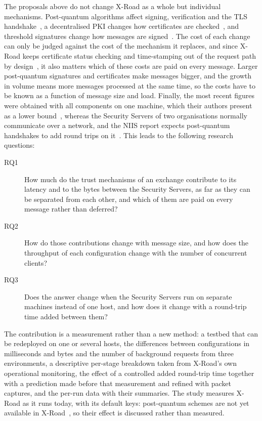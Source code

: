 \documentclass[conference,a4paper]{IEEEtran}
\begin{document}
The proposals above do not change X-Road as a whole but individual mechanisms. Post-quantum
algorithms affect signing, verification and the TLS handshake~\cite{bakhtina2026pqc}, a
decentralised PKI changes how certificates are checked~\cite{bakhtina2023ares}, and threshold
signatures change how messages are signed~\cite{bakhtina2026ijis}. The cost of each change can only
be judged against the cost of the mechanism it replaces, and since X-Road keeps certificate status
checking and time-stamping out of the request path by design~\cite{ansper2013}, it also matters
which of these costs are paid on every message. Larger post-quantum signatures and certificates make
messages bigger, and the growth in volume means more messages processed at the same time, so the
costs have to be known as a function of message size and load. Finally, the most recent figures were
obtained with all components on one machine, which their authors present as a lower
bound~\cite{bakhtina2026ijis}, whereas the Security Servers of two organisations normally communicate
over a network, and the NIIS report expects post-quantum handshakes to add round trips on
it~\cite{bakhtina2026pqc}. This leads to the following research questions:

\begin{description}
  \item[RQ1] How much do the trust mechanisms of an exchange contribute to its latency and to the
  bytes between the Security Servers, as far as they can be separated from each other, and which of
  them are paid on every message rather than deferred?
  \item[RQ2] How do those contributions change with message size, and how does the throughput of each
  configuration change with the number of concurrent clients?
  \item[RQ3] Does the answer change when the Security Servers run on separate machines instead of one
  host, and how does it change with a round-trip time added between them?
\end{description}

The contribution is a measurement rather than a new method: a testbed that can be redeployed on one
or several hosts, the differences
between configurations in milliseconds and bytes and the number of background requests from three
environments, a descriptive per-stage breakdown taken from X-Road's own operational monitoring, the effect of a
controlled added round-trip time together with a prediction made before that measurement and
refined with packet captures, and the per-run data with their summaries. The study
measures X-Road as it runs today, with its default keys: post-quantum schemes are not yet available
in X-Road~\cite{bakhtina2026pqc,snetkov2023}, so their effect is discussed rather than measured.
\end{document}
